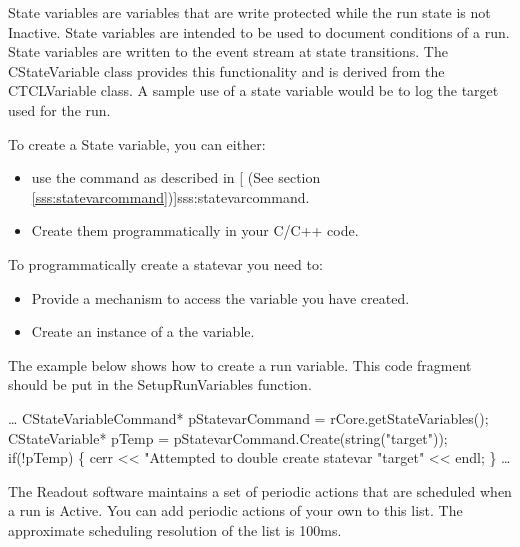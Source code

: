       
      State variables are variables that are write protected while the
      run state is not Inactive.  State variables are intended to be used
      to document conditions of a run.  State variables are written to the
      event stream at state transitions.  The CStateVariable class 
      provides this functionality and is derived from the CTCLVariable class.
      A sample use of a state variable would be to log the target used
      for the run. 
  
      To create a State variable, you can either:
      \begin{itemize}
         \item use the  command as described in 
            [
            (See section \ref{sss:statevarcommand})]{sss:statevarcommand}.
         \item Create them programmatically in your C/C++ code.
      \end{itemize}
      
      To programmatically create a statevar you need to:
      \begin{itemize}
         \item Provide a mechanism to access the variable you have created.
         \item Create an instance of a the variable.
      \end{itemize}

        The example below shows how to create a run variable.  This code 
         fragment should be put in the SetupRunVariables function.
         
         \begin{example}
            \ldots
            CStateVariableCommand* pStatevarCommand = 
                  rCore.getStateVariables();
            CStateVariable* pTemp = 
                  pStatevarCommand.Create(string("target"));
            if(!pTemp) \{
               cerr << "Attempted to double create statevar "target"
                     << endl;
            \}
            \ldots
         \end{example}

      
      The Readout software maintains a set of periodic actions
      that are scheduled when a run is  Active.  You can add
      periodic actions of your own to this list.  The approximate scheduling
      resolution of the  list is 100ms.
      
